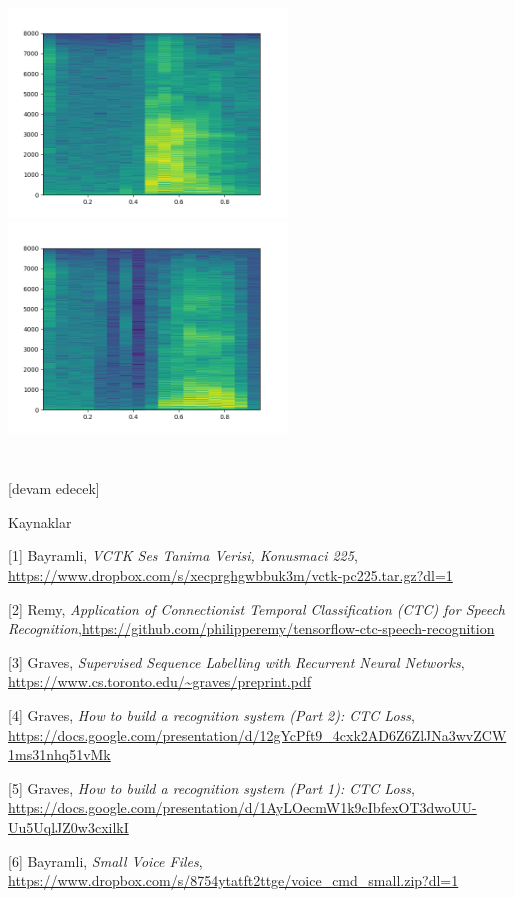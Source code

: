 \documentclass[12pt,fleqn]{article}\usepackage{../../common}
\begin{document}
\includegraphics[width=20em]{speech_03.png}
\includegraphics[width=20em]{speech_04.png}


\inputminted[fontsize=\footnotesize]{python}{model1.py}

\inputminted[fontsize=\footnotesize]{python}{train_rnn.py}


[devam edecek]



Kaynaklar

[1] Bayramli, {\em VCTK Ses Tanima Verisi, Konusmaci 225}, \url{https://www.dropbox.com/s/xecprghgwbbuk3m/vctk-pc225.tar.gz?dl=1}

[2] Remy, {\em Application of Connectionist Temporal Classification (CTC) for Speech Recognition},\url{https://github.com/philipperemy/tensorflow-ctc-speech-recognition}

[3] Graves, {\em Supervised Sequence Labelling with Recurrent Neural Networks}, \url{https://www.cs.toronto.edu/~graves/preprint.pdf}

[4] Graves, {\em How to build a recognition system (Part 2): CTC Loss}, \url{https://docs.google.com/presentation/d/12gYcPft9_4cxk2AD6Z6ZlJNa3wvZCW1ms31nhq51vMk}

[5] Graves, {\em How to build a recognition system (Part 1): CTC Loss}, \url{https://docs.google.com/presentation/d/1AyLOecmW1k9cIbfexOT3dwoUU-Uu5UqlJZ0w3cxilkI}

[6] Bayramli, {\em Small Voice Files}, \url{https://www.dropbox.com/s/8754ytatft2ttge/voice_cmd_small.zip?dl=1}
\end{document}
